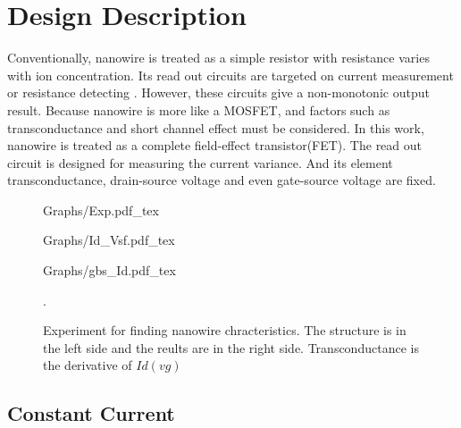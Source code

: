 \documentclass{article}
\begin{document}
\section{Design Description}
\label{sec:rules}

Conventionally, nanowire is treated as a simple resistor with resistance varies with ion concentration.
Its read out circuits are targeted on current measurement or resistance detecting \cite{C5}.
However, these circuits give a non-monotonic output result. Because nanowire is more like a MOSFET, and factors such as transconductance and short channel effect must be considered.
In this work, nanowire is treated as a complete field-effect transistor(FET).
The read out circuit is designed for measuring the current variance.
And its element transconductance, drain-source voltage and even gate-source voltage  are fixed.

\begin{figure}[!t]
    \begin{minipage}[!htb]{0\linewidth}
        \centering
        \def\svgwidth{3cm}
        \fontsize{6}{15}\selectfont
         {Graphs/Exp.pdf_tex}
    \end{minipage}
    \hfill
    \begin{minipage}[!htb]{0.6\linewidth}
        \begin{minipage}[!htb]{0.97\linewidth}
            \centering
            \def\svgwidth{4.3cm}
            \fontsize{5}{15}\selectfont
             {Graphs/Id_Vsf.pdf_tex}
        \end{minipage}
        \vfill
        \begin{minipage}[!htb]{1\linewidth}
            \centering
            \def\svgwidth{3.8cm}
            \fontsize{5}{15}\selectfont
             {Graphs/gbs_Id.pdf_tex}
        \end{minipage}
    \end{minipage}
    \caption{Experiment for finding nanowire chracteristics. The structure is in the left side and
        the reults are in the right side. Transconductance is the derivative of $Id(vg)$}.
    \label{fig:res}
\end{figure}


\subsection{Constant Current}
\end{document}
